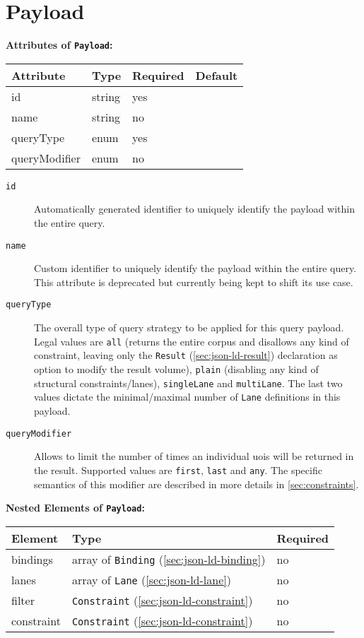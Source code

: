 \documentclass[11pt,a4paper]{report}
\newcommand{\iqlType}[1]{\texttt{\iqlns#1}}
\newenvironment{attributes}[1]{
	\noindent\textbf{Attributes of #1:}\newline\medskip
	\begin{tabular}{|p{0.3\textwidth}|p{0.20\textwidth}|p{0.20\textwidth}|p{0.17\textwidth}|}
		\hline
		\textbf{Attribute} & \textbf{Type} & \textbf{Required} & \textbf{Default} \\ 
		\hline
		\hline
	}{
	\end{tabular}
}
\newcommand{\attribute}[4]{
	#1 & #2 & #3 & #4 \\
	\hline
}
\newenvironment{elements}[1]{
	\noindent\textbf{Nested Elements of #1:}\newline\medskip
	\begin{tabular}{|p{0.3\textwidth}|p{0.42\textwidth}|p{0.17\textwidth}|}
		\hline
		\textbf{Element} & \textbf{Type} & \textbf{Required} \\ 
		\hline
		\hline
	}{
	\end{tabular}
}
\newcommand{\element}[3]{
	#1 & #2 & #3 \\
	\hline
}
\begin{document}
\section{Payload}
\label{sec:json-ld-payload}
\begin{attributes}{\iqlType{Payload}}
	\attribute{id}{string}{yes}{}
	\attribute{name}{string}{no}{}
	\attribute{queryType}{enum}{yes}{}
	\attribute{queryModifier}{enum}{no}{}
\end{attributes}
\begin{description}
	\item[\iqlType{id}] Automatically generated identifier to uniquely identify the payload within the entire query.
	\item[\iqlType{name}] Custom identifier to uniquely identify the payload within the entire query. This attribute is deprecated but currently being kept to shift its use case.
	\item[\iqlType{queryType}] The overall type of query strategy to be applied for this query payload. Legal values are \texttt{all} (returns the entire corpus and disallows any kind of constraint, leaving only the \iqlType{Result} (\ref{sec:json-ld-result}) declaration as option to modify the result volume), \texttt{plain} (disabling any kind of structural constraints/lanes), \texttt{singleLane} and \texttt{multiLane}. The last two values dictate the minimal/maximal number of \iqlType{Lane} definitions in this payload.
	\item[\iqlType{queryModifier}] Allows to limit the number of times an individual \acp{uoi} will be returned in the result. Supported values are \texttt{first}, \texttt{last} and \texttt{any}. The specific semantics of this modifier are described in more details in \cref{sec:constraints}.
\end{description}
\begin{elements}{\iqlType{Payload}}
	\element{bindings}{array of \iqlType{Binding} (\ref{sec:json-ld-binding})}{no}
	\element{lanes}{array of \iqlType{Lane} (\ref{sec:json-ld-lane})}{no}
	\element{filter}{\iqlType{Constraint} (\ref{sec:json-ld-constraint})}{no}
	\element{constraint}{\iqlType{Constraint} (\ref{sec:json-ld-constraint})}{no}
\end{elements}
\end{document}
